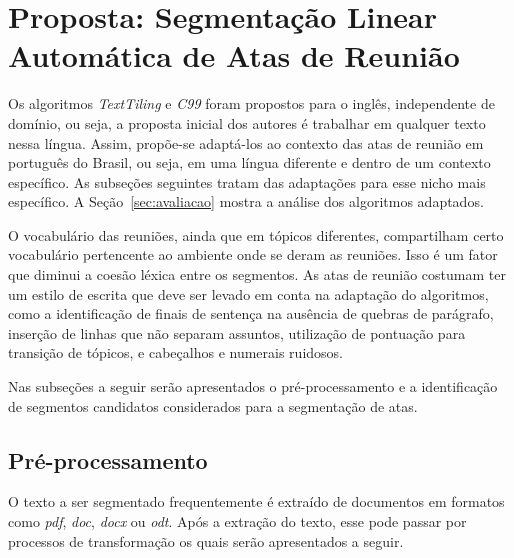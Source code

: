 \section{Proposta: Segmentação Linear Automática de Atas de Reunião}
	\label{sec:proposta}






Os algoritmos \textit{TextTiling} e \textit{C99} foram propostos para o inglês, independente de domínio, ou seja, a proposta inicial dos autores é trabalhar em qualquer texto nessa língua.
Assim, propõe-se adaptá-los ao contexto das atas de reunião em português do Brasil, ou seja, em uma língua diferente e dentro de um contexto específico. As subseções seguintes tratam das adaptações para esse nicho mais específico. A Seção~\ref{sec:avaliacao} mostra a análise dos algoritmos adaptados.

O vocabulário das reuniões, ainda que em tópicos diferentes, compartilham certo vocabulário pertencente ao ambiente onde se deram as reuniões. Isso é um fator que diminui a coesão léxica entre os segmentos.
As atas de reunião costumam ter um estilo de escrita que deve ser levado em conta na adaptação do algoritmos, como a identificação de finais de sentença na ausência de quebras de parágrafo, inserção de linhas que não separam assuntos, utilização de pontuação para transição de tópicos, e cabeçalhos e numerais ruidosos. 

Nas subseções a seguir serão apresentados o pré-processamento e a identificação de segmentos candidatos considerados para a segmentação de atas.





\subsection{Pré-processamento}
	\label{subsec:preprocessamento}




	O texto a ser segmentado frequentemente é extraído de documentos em formatos como \textit{pdf}, \textit{doc}, \textit{docx} ou \textit{odt}. Após a extração do texto, esse pode passar por processos de transformação os quais serão apresentados a seguir.
	
